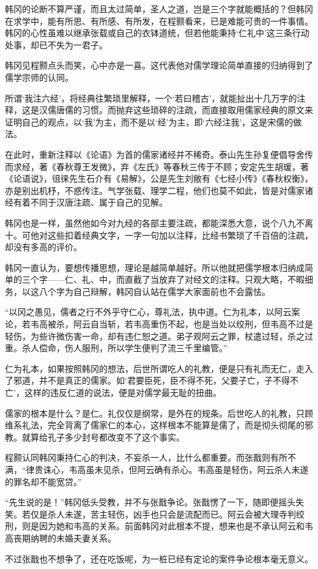 韩冈的论断不算严谨，而且太过简单，圣人之道，岂是三个字就能概括的？但韩冈在求学中，能有所思、有所感、有所发，在程颢看来，已是难能可贵的一件事情。韩冈的心性虽难以继承张载或自己的衣钵道统，但若他能秉持‘仁礼中’这三条行动处事，却已不失为一君子。

韩冈见程颢点头而笑，心中亦是一喜。这代表他对儒学理论简单直接的归纳得到了儒学宗师的认同。

所谓‘我注六经’，将经典往繁琐里解释，一个‘若曰稽古’，就能扯出十几万字的注释，这是汉儒唐儒的习惯。而抛弃这些琐碎的注疏，而直接取用儒家经典的原文来证明自己的观点，以‘我’为主，而不是以‘经’为主，即‘六经注我’，这是宋儒的做法。

在此时，重新注释以《论语》为首的儒家诸经并不稀奇。泰山先生孙复便倡导舍传而求经，著《春秋尊王发微》，弃《左氏》等春秋三传于不顾；安定先生胡瑗，著《论语说》，徂徕先生石介有《易解》，公是先生刘敞有《七经小传》《春秋权衡》，亦是别出机杼，不惑传注。气学张载、理学二程，他们也莫不如此，皆是对儒家诸经有着不同于汉唐注疏、属于自己的见解。

韩冈也是一样，虽然他如今对九经的各部主要注疏，都能深悉大意，说个八九不离十。可他对这些扣着经典文字，一字一句加以注释，比经书繁琐了千百倍的注疏，却没有多高的评价。

韩冈一直认为，要想传播思想，理论是越简单越好。所以他就把儒学根本归纳成简单的三个字——仁、礼、中，而直截了当放弃了对经文的注释。只观大略，不暇细务，以这八个字为自己辩解，韩冈自认站在儒学大家面前也不会露怯。

“以冈之愚见，儒者之行不外乎守仁心，尊礼法，执中道。仁为礼本，以阿云案论，若韦高被杀，阿云自当斩，若韦高重伤不起，也是当处以绞刑，但韦高不过是轻伤，为些许微伤害一命，却有违仁恕之道。弟子观阿云之罪，杖遣过轻，杀之过重。杀人偿命，伤人服刑，所以学生便判了流三千里编管。”

仁为礼本，如果按照韩冈的想法，后世所谓吃人的礼教，便是只有礼而无仁，走入了邪道，并不是真正的儒家。如‘君要臣死，臣不得不死，父要子亡，子不得不亡’，这样的违反仁道的说法，便是对儒学最无耻的扭曲。

儒家的根本是什么？是仁。礼仅仅是纲常，是外在的规条。后世吃人的礼教，只顾维系礼法，完全背离了儒家仁的本心，这样根本不能算是儒了，而是彻头彻尾的邪教。就算给孔子多少封号都改变不了这个事实。

程颢认同韩冈秉持仁心的判决，不妄杀一人，比什么都重要。而张戬则有所不满，“律贵诛心，韦高虽未见杀，但阿云确有杀心。韦高虽是轻伤，阿云杀人未遂的罪名却不能宽贷。”

“先生说的是！”韩冈低头受教，并不与张戬争论。张戬愣了一下，随即便摇头失笑。若仅是杀人未遂，苦主轻伤，凶手也只会是流配而已。阿云会被大理寺判绞刑，则是因为她和韦高的关系。前面韩冈对此根本不提，想来也是不承认阿云和韦高丧期纳聘的未婚夫妻关系。

不过张戬也不想争了，还在吃饭呢，为一桩已经有定论的案件争论根本毫无意义。

